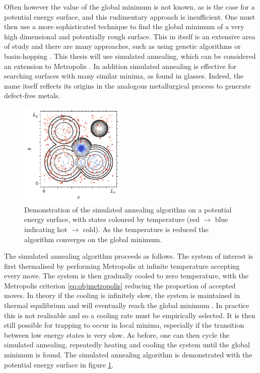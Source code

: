 Often however the value of the global minimum is not known, as is the case for a potential energy surface, and this rudimentary approach is insufficient.
One must then use a more sophisticated technique to find the global minimum of a very high dimensional and potentially rough surface.
This in itself is an extensive area of study and there are many approaches, such as using genetic algorithms or basin\--hopping \cite{Hartke1993,Niesse1996,Wales1997}.
This thesis will use simulated annealing, which can be considered an extension to Metropolis \mc{} \cite{Kirkpatrick1983}.
In addition simulated annealing is effective for searching surfaces with many similar minima, as found in glasses.
Indeed, the name itself reflects its origins in the analogous metallurgical process to generate defect\--free metals.

\begin{figure}[tb]
     \centering
    \includegraphics[width=0.45\textwidth]{./figures/methods/mc_2d_sa.pdf}
      \caption{Demonstration of the simulated annealing algorithm on a \td{} potential energy surface, with states coloured by temperature (red $\rightarrow$ blue indicating hot $\rightarrow$ cold). As the temperature is reduced the algorithm converges on the global minimum.}
      \label{fig:montecarloint5}
\end{figure}

The simulated annealing algorithm proceeds as follows.
The system of interest is first thermalised by performing Metropolis \mc{} at infinite temperature \ie{} accepting every move. 
The system is then gradually cooled to zero temperature, with the Metropolis criterion \eqref{eq:objmetropolis} reducing the proportion of accepted moves.
In theory if the cooling is infinitely slow, the system is maintained in thermal equilibrium and will eventually reach the global minimum \cite{Henderson2003}.
In practice this is not realisable and so a cooling rate must be empirically selected.
It is then still possible for trapping to occur in local minima, especially if the transition between low energy states is very slow.
As before, one can then cycle the simulated annealing, repeatedly heating and cooling the system until the global minimum is found.
The simulated annealing algorithm is demonstrated with the \td{} potential energy surface in figure \ref{fig:montecarloint5}.

